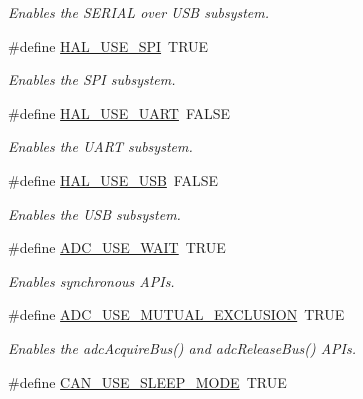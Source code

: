 \begin{DoxyCompactItemize}
\begin{DoxyCompactList}\small\item\em Enables the S\+E\+R\+I\+A\+L over U\+S\+B subsystem. \end{DoxyCompactList}\item 
\hypertarget{group__HAL__CONF_ga33a3c5bee9ed1f665aace8b88fed9b2b}{}\#define \hyperlink{group__HAL__CONF_ga33a3c5bee9ed1f665aace8b88fed9b2b}{H\+A\+L\+\_\+\+U\+S\+E\+\_\+\+S\+P\+I}~T\+R\+U\+E\label{group__HAL__CONF_ga33a3c5bee9ed1f665aace8b88fed9b2b}

\begin{DoxyCompactList}\small\item\em Enables the S\+P\+I subsystem. \end{DoxyCompactList}\item 
\hypertarget{group__HAL__CONF_ga73220cad2edf2aee77b7ce1b53cacff0}{}\#define \hyperlink{group__HAL__CONF_ga73220cad2edf2aee77b7ce1b53cacff0}{H\+A\+L\+\_\+\+U\+S\+E\+\_\+\+U\+A\+R\+T}~F\+A\+L\+S\+E\label{group__HAL__CONF_ga73220cad2edf2aee77b7ce1b53cacff0}

\begin{DoxyCompactList}\small\item\em Enables the U\+A\+R\+T subsystem. \end{DoxyCompactList}\item 
\hypertarget{group__HAL__CONF_gafc8f8fc6010f46f5baae4a369e14974e}{}\#define \hyperlink{group__HAL__CONF_gafc8f8fc6010f46f5baae4a369e14974e}{H\+A\+L\+\_\+\+U\+S\+E\+\_\+\+U\+S\+B}~F\+A\+L\+S\+E\label{group__HAL__CONF_gafc8f8fc6010f46f5baae4a369e14974e}

\begin{DoxyCompactList}\small\item\em Enables the U\+S\+B subsystem. \end{DoxyCompactList}\item 
\#define \hyperlink{group__HAL__CONF_ga39e892a4090185fbdda9bb105bc03b4f}{A\+D\+C\+\_\+\+U\+S\+E\+\_\+\+W\+A\+I\+T}~T\+R\+U\+E
\begin{DoxyCompactList}\small\item\em Enables synchronous A\+P\+Is. \end{DoxyCompactList}\item 
\#define \hyperlink{group__HAL__CONF_gac0893cb47e338c2dabad34b974a0a88d}{A\+D\+C\+\_\+\+U\+S\+E\+\_\+\+M\+U\+T\+U\+A\+L\+\_\+\+E\+X\+C\+L\+U\+S\+I\+O\+N}~T\+R\+U\+E
\begin{DoxyCompactList}\small\item\em Enables the {\ttfamily adc\+Acquire\+Bus()} and {\ttfamily adc\+Release\+Bus()} A\+P\+Is. \end{DoxyCompactList}\item 
\hypertarget{group__HAL__CONF_ga5294d9d12e4186c781df3b2f1d8bd80b}{}\#define \hyperlink{group__HAL__CONF_ga5294d9d12e4186c781df3b2f1d8bd80b}{C\+A\+N\+\_\+\+U\+S\+E\+\_\+\+S\+L\+E\+E\+P\+\_\+\+M\+O\+D\+E}~T\+R\+U\+E\label{group__HAL__CONF_ga5294d9d12e4186c781df3b2f1d8bd80b}


\end{DoxyCompactItemize}
